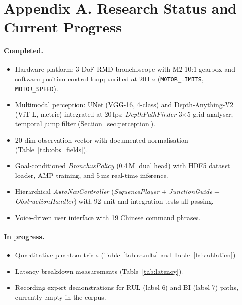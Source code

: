 \documentclass[journal,comsoc]{IEEEtran}
\begin{document}
\section*{Appendix A. Research Status and Current Progress}
\label{sec:status}

\paragraph{Completed.}
\begin{itemize}[leftmargin=*,topsep=1pt,itemsep=0pt]
\item Hardware platform: 3-DoF RMD bronchoscope with M2 10:1 gearbox
      and software position-control loop; verified at 20\,Hz
      (\texttt{MOTOR\_LIMITS}, \texttt{MOTOR\_SPEED}).
\item Multimodal perception: UNet (VGG-16, 4-class) and
      Depth-Anything-V2 (ViT-L, metric) integrated at 20\,fps;
      \textit{DepthPathFinder} 3$\times$5 grid analyser; temporal
      jump filter
      (Section~\ref{sec:perception}).
\item 20-dim observation vector with documented normalisation
      (Table~\ref{tab:obs_fields}).
\item Goal-conditioned \textit{BronchusPolicy} (0.4\,M, dual head)
      with HDF5 dataset loader, AMP training, and 5\,ms real-time
      inference.
\item Hierarchical \textit{AutoNavController}
      (\textit{SequencePlayer} + \textit{JunctionGuide} +
      \textit{ObstructionHandler}) with 92 unit and integration
      tests all passing.
\item Voice-driven user interface with 19 Chinese command phrases.
\end{itemize}

\paragraph{In progress.}
\begin{itemize}[leftmargin=*,topsep=1pt,itemsep=0pt]
\item Quantitative phantom trials (Table~\ref{tab:results} and
      Table~\ref{tab:ablation}).
\item Latency breakdown measurements (Table~\ref{tab:latency}).
\item Recording expert demonstrations for RUL (label 6) and BI
      (label 7) paths, currently empty in the corpus.
\end{itemize}
\end{document}
